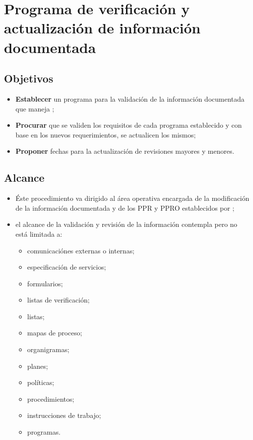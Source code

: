 \renewcommand{\MayorVer}{1}
\renewcommand{\MenorVer}{0}
\renewcommand{\Codigo}{G-1-PRO}
\renewcommand{\FechaPub}{2023--01}
\renewcommand{\Titulo}{Programa de verificación y actualización de información documentada}

\section{\Titulo}
\label{informacion.actualizacion}

\subsection{Objetivos}
\begin{itemize}
    \item \textbf{Establecer} un programa para la validación de la información documentada que maneja ;
    \item \textbf{Procurar} que se validen los requisitos de cada programa establecido y con base en los nuevos requerimientos, se actualicen los mismos;
    \item \textbf{Proponer} fechas para la actualización de revisiones mayores y menores.
\end{itemize}

\subsection{Alcance}
\begin{itemize}
    \item Éste procedimiento va dirigido al área operativa encargada de la modificación de la información documentada y de los \gls{PPR} y \gls{PPRO} establecidos por ;
    \item el alcance de la validación y revisión de la información contempla pero no está limitada a:
          \begin{itemize}
              \item comunicaciónes externas o internas;
              \item especificación de servicios;
              \item formularios;
              \item listas de verificación;
              \item listas;
              \item mapas de proceso;
              \item organigramas;
              \item planes;
              \item políticas;
              \item procedimientos;
              \item instrucciones de trabajo;
              \item programas.
          \end{itemize}
\end{itemize}

